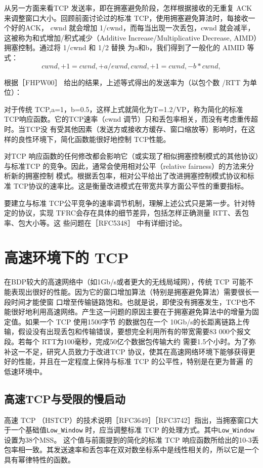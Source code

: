 从另一方面来看TCP 发送率，即在拥塞避免阶段，怎样根据接收的无重复 ACK来调整窗口大小。回顾前面讨论过的标准 TCP，使用拥塞避免算法时，每接收一个好的ACK，
cwnd 就会增加 1/cwnd，而每当出现一次丢包，cwnd 就会减半，这被称为和式增加/积式减少（Additive Increase/Multiplicative Decrease, AIMD）拥塞控制。通过将 1/cwnd 和 1/2 替换
为a和b，我们得到了一般化的 AIMID 等式：
\begin{equation}
    cwnd, +1 = cwnd, + a/ewnd,
    cwnd, + 1 = cwnd, - b*cwnd,
\end{equation}

根据［FHPW00］ 给出的结果，上述等式得出的发送率为（以包个数 /RTT 为单位）：

对于传统 TCP,a=1，b=0.5，这样上式就简化为T=1.2/VP，称为简化的标准 TCP响应函数。它的TCP速率（cwnd 调节）只和丢包率相关，而没有考虑重传超时。当TCP没
有受其他因素（发送方或接收方缓存、窗口缩放等）影响时，在这样的良性环境下，简化函数能很好地控制 TCP性能。

对TCP 响应函数的任何修改都会影响它（或实现了相似拥塞控制模式的其他协议）与标准TCP 的竞争。因此，通常会使用相对公平（relative fairness）的方法来分析新的拥塞控制
模式。根据丢包率，相对公平给出了改进拥塞控制模式协议和标准 TCP协议的速率比。这是衡量改进模式在带宽共享方面公平性的重要指标。

要建立与标准 TCP公平竞争的速率调节机制，理解上述公式只是第一步。针对特定的协议，实现 TFRC会存在具体的细节差异，包括怎样正确测量 RTT、丢包率、包大小等。这
些问题在［RFC5348］ 中有详细讨论。

\section{高速环境下的 TCP}

在BDP较大的高速网络中（如1Gb/s或者更大的无线局域网），传统 TCP 可能不能表现出很好的性能。因为它的窗口增加算法（特别是拥塞避免算法）需要很长一段时间才能使窗
口增至传输链路饱和。也就是说，即使没有拥塞发生，TCP也不能很好地利用高速网络。产生这一问题的原因主要在于拥塞避免算法中的增量为固定值。如果一个 TCP 使用1500字节
的数据包在一个 10Gb/s的长距离链路上传输，假设没有出现丢包和传输错误，要想完全利用所有的带宽需要83 000个报文段。若每个 RTT为100毫秒，完成50亿个数据包传输大约
需要1.5个小时。为了弥补这一不足，研究人员致力于改进TCP 协议，使其在高速网络环境下能够获得更好的性能，并且在一定程度上保持与标准 TCP 的公平性，特别是在更为普遍
的低速环境中。

\subsection{高速TCP与受限的慢启动}
高速 TCP （HSTCP）的技术说明［RFC3649］［RFC3742］指出，当拥塞窗口大于一个基础值\verb|Low_Window| 时，应当调整标准 TCP 的处理方式。其中\verb|Low_Window| 设置为38个MSS。
这个值与前面提到的简化的标准 TCP 响应函数所给出的10-3丢包率相一致。其发送速率和丢包率在双对数坐标系中是线性相关的，所以它是一个具有幂律特性的函数。

